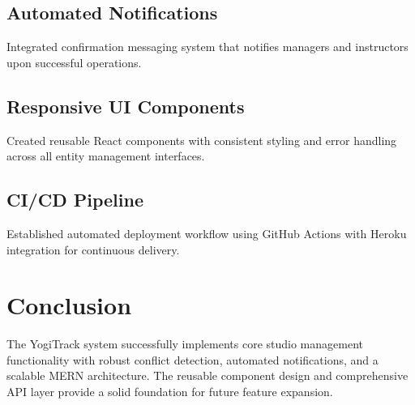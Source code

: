 \documentclass[11pt,a4paper]{article}
\begin{document}
\subsection{Automated Notifications}
Integrated confirmation messaging system that notifies managers and instructors upon successful operations.

\subsection{Responsive UI Components}
Created reusable React components with consistent styling and error handling across all entity management interfaces.

\subsection{CI/CD Pipeline}
Established automated deployment workflow using GitHub Actions with Heroku integration for continuous delivery.

\section{Conclusion}

The YogiTrack system successfully implements core studio management functionality with robust conflict detection, automated notifications, and a scalable MERN architecture. The reusable component design and comprehensive API layer provide a solid foundation for future feature expansion.
\end{document}
